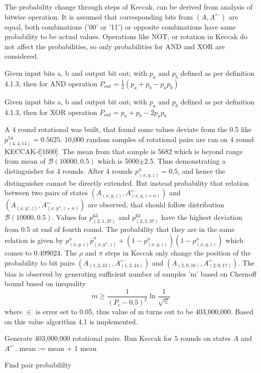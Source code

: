 The probability change through steps of Keccak, can be derived from analysis of bitwise operation. It is assumed
that corresponding bits from $(A, A^{\leftarrow})$ are equal, both combinations ('00' or '11') or opposite combinations
have same probability to be actual values. Operations like NOT, or rotation in Keccak do not affect the probabilities,
so only probabilities for AND and XOR are considered.

\begin{lem}
Given input bits a, b and output bit out; with $p_a$ and $p_b$ defined as per definition 4.1.3, then for AND operation
$P_{out} = \frac{1}{2}(p_{a} + p_{b} - p_{a} p_{b})$ \cite{00022}
\end{lem}

\begin{lem}
Given input bits a, b and output bit out; with $p_a$ and $p_b$ defined as per definition 4.1.3, then for XOR operation
$P_{out} = p_{a} + p_{b} - 2 p_{a} p_{b}$ \cite{00022}
\end{lem}

A 4 round rotational was built, that found some values deviate from the 0.5 like $p^{54}_{(4, 4, 14)} = 0.5625$. 10,000
random samples of rotational pairs are ran on 4 round KECCAK-f[1600]. The mean from that sample is 5682 which is beyond
range from mean of $\mathcal{B}(10000, 0.5)$ which is 5000$\pm$2.5. Thus demonstrating a distinguisher for 4 rounds.
After 4 rounds $p^n_{(x, y, z)} = 0.5$, and hence the distinguisher cannot be directly extended. But instead probability
that relation between two pairs of states $(A_{(x, y, z)}, A^{\leftarrow}_{(x, y, z+n)})$ and 
$(A_{(x, y', z)}, A^{\leftarrow}_{(x, y'', z+n)})$ are observed, that should follow distribution $\mathcal{B}(10000, 0.5)$.
Values for $p^{63}_{(2, 1, 37)}$ and $p^{63}_{(2, 2, 37)}$ have the highest deviation from 0.5 at end of fourth round. The
probability that they are in the same relation is given by $p^n_{(x, y, z)} \dot p^n_{(x, y'', z)} + (1 - p^n_{(x, y, z)})
(1 - p^n_{(x, y, z)})$ which comes to 0.499024. The $\rho$ and $\pi$ steps in Keccak only change the position of the
probability to bit pairs $(A_{(1, 2, 43)}, A^{\leftarrow}_{(1, 2, 44)})$ and $(A_{(2, 0, 16)}, A^{\leftarrow}_{(2, 0, 17)})$.
The bias is observed by generating sufficient number of samples 'm' based on Chernoff bound based on inequality 
\[ m \geq \frac{1}{(P_c - 0.5)^2} \ln \frac{1}{\sqrt \in}\]
where $\in$ is error set to 0.05, thus value of m turns out to be 403,000,000. Based on this value algorithm 4.1 is implemented.
  \begin{algorithm}
  \begin{algorithmic}[1]
    \State Generate 403,000,000 rotational pairs.
      \State Run Keccak for 5 rounds on states $A$ and $A^{\leftarrow}$.
      \State mean := mean + 1
      \EndIf
    \EndFor
    \State \Return mean
  \end{algorithmic}
  \caption[Find pair probabililty \cite{00022}]{Find pair probabililty \cite{00022}}
  \label{alg:seq}
  \end{algorithm}

